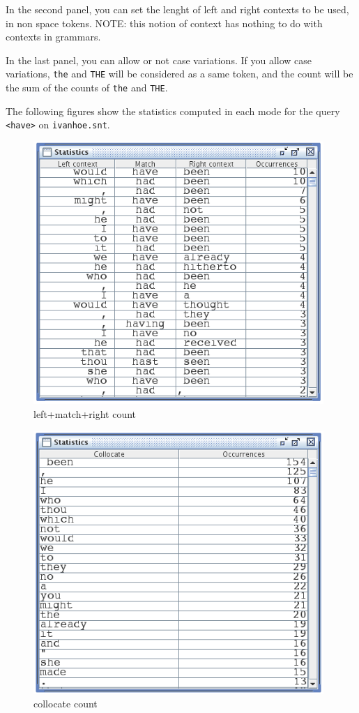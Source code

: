 \bigskip
\noindent In the second panel, you can set the lenght of left and right
contexts to be used, in non space tokens. NOTE: this notion of context has
nothing to do with contexts in grammars.

\bigskip
\noindent In the last panel, you can allow or not case variations. If you allow
case variations, \verb$the$ and \verb$THE$ will be considered as a same token,
and the count will be the sum of the counts of \verb$the$ and \verb$THE$.

\bigskip
\noindent The following figures show the statistics computed in each mode for
the query \verb$<have>$ on \verb$ivanhoe.snt$.


\bigskip
\begin{figure}[!ht]
\begin{center}
\includegraphics[width=11cm]{resources/img/fig4-10.png}
\caption{left+match+right count\label{fig-statistics-mode0}}
\end{center}
\end{figure}

\begin{figure}[!ht]
\begin{center}
\includegraphics[width=11cm]{resources/img/fig4-11.png}
\caption{collocate count\label{fig-statistics-mode1}}
\end{center}
\end{figure}

